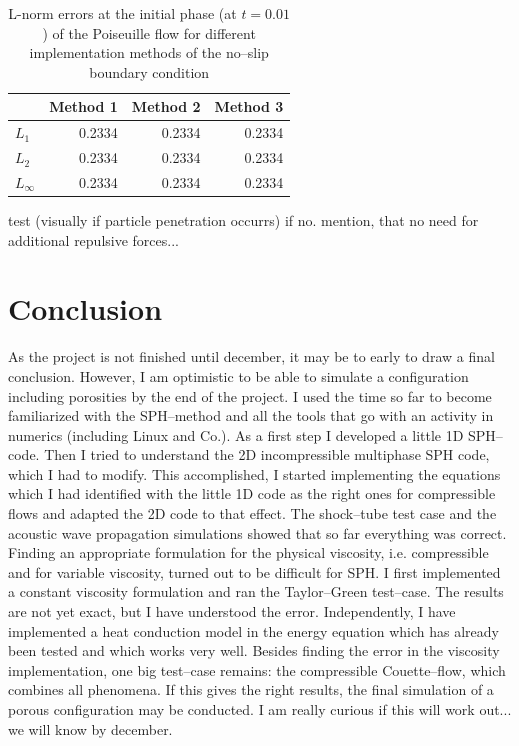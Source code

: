 \documentclass{report}
\begin{document}
\begin{table}[h] %
\label{tab:2DSPH_LinearWall_Poiseuille_Errors}
\centering
\begin{tabular}[c]{||l||r|r|r||} %
\hline
\hline
 &{\bf Method 1} & {\bf Method 2} & {\bf Method 3}\\
\hline
\hline
$L_1$&0.2334 & 0.2334 & 0.2334 \\
\hline
$L_2$&0.2334 & 0.2334 & 0.2334 \\
\hline
$L_\infty$&0.2334 & 0.2334 & 0.2334 \\
\hline
\hline
\end{tabular}
\caption[]{L-norm errors at the initial phase (at $t=0.01$) of the Poiseuille flow 
for different implementation methods of the no--slip boundary condition }
\end{table}

test (visually if particle penetration occurrs) if no. mention, that no need for additional repulsive forces...

 \chapter{Conclusion}
\label{sec:conclusion}
As the project is not finished until december, it may be to early to draw a final conclusion. However, I am optimistic to be able to simulate a configuration including porosities by the end of the project. I used the time so far to become familiarized with the SPH--method and all the tools that go with an activity in numerics (including Linux and Co.). As a first step I developed a little 1D SPH--code. Then I tried to understand the 2D incompressible multiphase SPH code, which I had to modify. This accomplished, I started implementing the equations which I had identified with the little 1D code as the right ones for compressible flows and adapted the 2D code to that effect. The shock--tube test case and the acoustic wave propagation simulations showed that so far everything was correct.
Finding an appropriate formulation for the physical viscosity, i.e. compressible and for variable viscosity, turned out to be difficult for SPH. I first implemented a constant viscosity formulation and ran the Taylor--Green test--case. The results are not yet exact, but I have understood the error. Independently, I have implemented a heat conduction model in the energy equation which has already been tested and which works very well.
Besides finding the error in the viscosity implementation, one big test--case remains: the compressible Couette--flow, which combines all phenomena.
If this gives the right results, the final simulation of a porous configuration may be conducted. I am really curious if this will work out... we will know by december.
\end{document}
